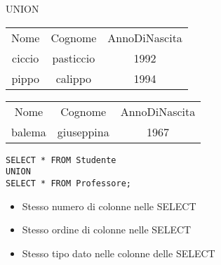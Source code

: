 \begin{frame}{UNION}
\begin{table}[h]
\centering
\begin{minipage}{.45\textwidth}
\centering
\begin{tabular}{|c|c|c|}
\hline
\rowcolor{cyan!30} \multicolumn{3}{|c|}{Studente} \\
\hline
\rowcolor{cyan!30} Nome  & Cognome & AnnoDiNascita \\
\hline
ciccio  & pasticcio & 1992 \\
pippo  & calippo & 1994 \\

\hline
\end{tabular}
\end{minipage}%
\begin{minipage}{.45\textwidth}
\centering
\begin{tabular}{|c|c|c|}
\hline
\rowcolor{cyan!30} \multicolumn{3}{|c|}{Professore} \\
\hline
\rowcolor{cyan!30} Nome  & Cognome & AnnoDiNascita \\
\hline
balema & giuseppina & 1967 \\

\hline
\end{tabular}
\end{minipage}
\end{table}
\vspace{2em}
\texttt{SELECT * FROM Studente\\UNION\\SELECT * FROM Professore;}
\begin{itemize}
    \item Stesso numero di colonne nelle SELECT
    \item Stesso ordine di colonne nelle SELECT
    \item Stesso tipo dato nelle colonne delle SELECT
\end{itemize}
\end{frame}

